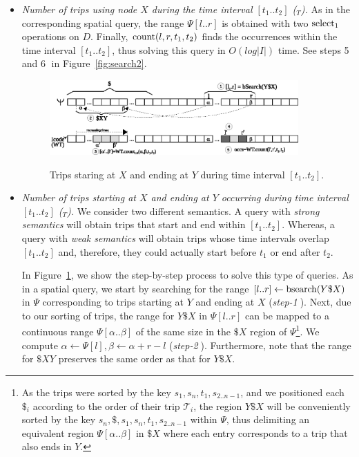 \begin{itemize}
		\item {\em Number of trips using node $X$ during the time interval $[t_1..t_2]$ (\loadX$_T$).}
		As in the corresponding spatial query, the range $\Psi[l..r]$  is obtained with two $\operatorname{select}_1$ operations on $D$.
		Finally, $\operatorname{count}(l,r,t_1,t_2)$ finds the occurrences within the time interval $[t_1..t_2]$, thus solving this query in $O(log|I|)$ time.
		See steps \textcircled{5} and \textcircled{6} in Figure~\ref{fig:search2}.


	\begin{figure}[th]
		\begin{center}
			{\includegraphics[width=0.90\textwidth]{figures/search.eps}}
		\end{center}
		\caption{Trips staring at $X$ and ending at $Y$ during time interval $[t_1..t_2]$.}
		\label{fig:search}
	\end{figure}
	
		\item {\em Number of trips starting at $X$ and ending at $Y$ occurring during  time interval $[t_1..t_2]$ (\XtoY$_T$).}
		We consider two different semantics. A query with  {\em strong semantics} will obtain trips
		that start and end within  $[t_1..t_2]$. Whereas, a query with  {\em weak semantics} will obtain trips whose time intervals overlap  $[t_1..t_2]$ and, therefore, they could actually start before $t_1$ or end after $t_2$.
		
		In Figure~\ref{fig:search}, we show the step-by-step process to solve this type of queries.
		As in a spatial query, we start by searching for the range $[l..r] \leftarrow \operatorname{bsearch}(Y\$X)$ in $\Psi$ corresponding 
		to trips starting at $Y$ and ending at $X$ ({\em step-\textcircled{1}}). Next, due to our sorting of trips, the range for $Y\$X$ in $\Psi[l..r]$
		can be mapped to a continuous range $\Psi[\alpha..\beta]$ of the same size in the $\$X$ region of $\Psi$\footnote{As the trips were sorted by the key $s_1,s_n,t_1,s_{2..n-1}$, and we positioned each $\$_i$ according to the order of their trip $\mathcal{T}_i$, the region $Y\$X$ will be conveniently sorted by the key $s_n,\$,s_1,s_n,t_1,s_{2..n-1}$ within $\Psi$, thus delimiting an equivalent region $\Psi[\alpha..\beta]$ in $\$X$ where each entry corresponds to a trip that also ends in $Y$.}. 
		We compute $\alpha \leftarrow \Psi[l], 
		\beta\leftarrow\alpha+r-l$ ({\em step-\textcircled{2}}). Furthermore, note that the range for $\$XY$ preserves the same order as that for $Y\$X$.
		

\end{itemize}

